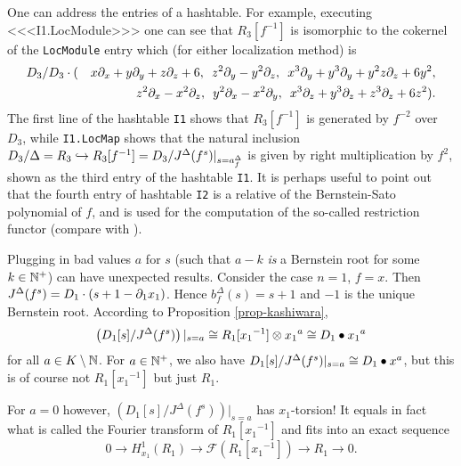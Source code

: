\begin{example}
One can address the entries of a hashtable.  For
example, executing
<<<I1.LocModule>>>
one can see that 
$R_3[f^{-1}]$ is isomorphic to the cokernel of the {\tt LocModule}
entry which (for either localization method) is
\begin{eqnarray*}
D_3/&D_3\cdot(&x\partial_x+y\partial_y+z\partial_z+6,\,\,\,z^2\partial_y-y^2\partial_z,\,\,\,x^3\partial_y+y^3\partial_y+y^2z\partial_z+6y^2,\\ 
         &&      z^2\partial_x-x^2\partial_z,\,\,\,y^2\partial_x-x^2\partial_y,\,\,\, 
               x^3\partial_z+y^3\partial_z+z^3\partial_z+6z^2).
\end{eqnarray*}
The first line of the hashtable {\tt I1} shows 
that $R_3[f^{-1}]$ is generated
by $f^{-2}$ over $D_3$, while {\tt I1.LocMap} shows that the natural inclusion
$D_3/\Delta=R_3\hookrightarrow R_3[f^{-1}]=D_3/J^\Delta(f^s)|_{s=a^\Delta_f}$ 
is given by right multiplication by $f^2$, shown as the third entry
of the hashtable {\tt I1}.
It is perhaps useful to point out that the fourth entry of hashtable
{\tt I2} is a relative of the Bernstein-Sato polynomial of $f$, and is
used for the computation of the so-called restriction functor (compare
with \cite{DM:O-T1,DM:W2}).
\end{example}

\begin{remark}
Plugging in bad values $a$ for $s$ (such that $a-k$ {\em is} a Bernstein
root for some $k\in {\mathbb N}^+$) can have unexpected results. Consider the
case $n=1$, $f=x$. Then $J^\Delta(f^s)=D_1\cdot(s+1-\partial_1x_1)$. Hence
$b^\Delta_f(s)=s+1$ and $-1$ is the unique Bernstein root. According
to Proposition \ref{prop-kashiwara}, 
\[
\left(D_1[s]/J^\Delta(f^s)\right)|_{s=a}
\cong R_1[{x_1}^{-1}]\otimes {x_1}^a\cong D_1\bullet {x_1}^a
\]
for all $a\in K\setminus{\mathbb N}$. For $a\in{\mathbb N}^+$, we also have
$D_1[s]/J^\Delta(f^s)|_{s=a}\cong D_1\bullet x^a$, but this is of
course not $R_1[{x_1}^{-1}]$ but just $R_1$. 

For $a=0$ however, $\left(D_1[s]/J^\Delta(f^s)\right)|_{s=a}$ 
has $x_1$-torsion! It
equals in fact what is called the Fourier transform of
$R_1[{x_1}^{-1}]$ and fits into an exact sequence 
\[
0\to H^1_{x_1}(R_1)\to{\mathcal F}(R_1[{x_1}^{-1}])\to R_1\to 0.
\]
\end{remark}



